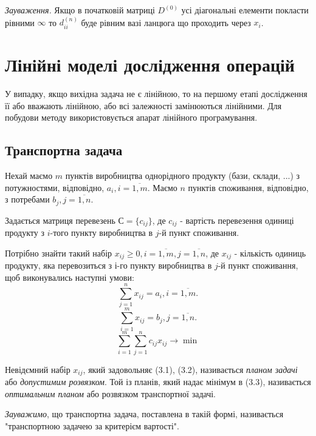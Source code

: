 \documentclass[12pt,a4paper]{book}
\begin{document}
\emph{Зауваження.} Якщо в початковій матриці $D^{(0)}$ усі діагональні елементи покласти рівними $\infty$ то $d_{ii}^{(n)}$ буде рівним вазі ланцюга що проходить через $x_i$.

\chapter{Лінійні моделі дослідження операцій}

У випадку, якщо вихідна задача не є лінійною, то на першому етапі дослідження її або вважають лінійною, або всі залежності замінюються лінійними. Для побудови методу використовується апарат лінійного програмування.

\section{Транспортна задача}

Нехай маємо $m$ пунктів виробництва однорідного продукту (бази, склади, ...) з потужностями, відповідно, $a_i, i = \overline{1, m}$. Маємо $n$ пунктів споживання, відповідно, з потребами $b_j, j =\overline{1, n}$.

Задається матриця перевезень $С = \{c_{ij}\}$, де $c_{ij}$ - вартість перевезення одиниці продукту з $i$-того пункту виробництва в $j$-й пункт споживання.

Потрібно знайти такий набір $x_{ij} \ge 0, i = \overline{1, m}, j = \overline{1, n}$, де  $x_{ij}$ - кількість одиниць продукту, яка перевозиться з $і$-го пункту виробництва в $j$-й пункт споживання, щоб виконувались наступні умови: 
\begin{equation}  \sum_{j=1}^n x_{ij} = a_i, i = \overline{1, m}. \end{equation}
\begin{equation} \sum_{i=1}^m x_{ij} = b_j, j = \overline{1, n}.   \end{equation}
\begin{equation} \sum_{i=1}^m \sum_{j=1}^n c_{ij} x_{ij} \to \min  \end{equation}

Невідємний набір $x_{ij}$, який задовольняє (3.1), (3.2), називається \emph{планом задачі} або \emph{допустимим розвязком}. Той із планів, який надає мінімум в (3.3), називається \emph{оптимальним планом} або розвязком транспортної задачі.

\emph{Зауважимо}, що транспортна задача, поставлена в такій формі, називається "транспортною задачею за критерієм вартості".
\end{document}

